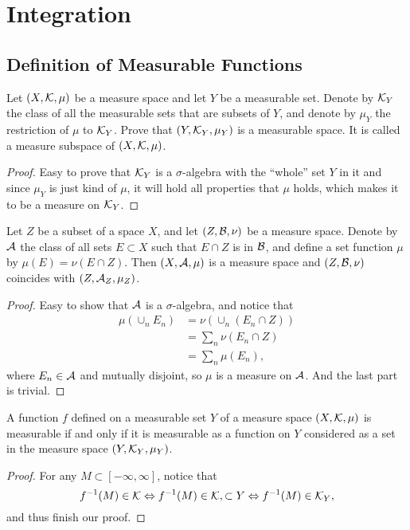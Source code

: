 \chapter{Integration}
\section{Definition of Measurable Functions}
\begin{pro}%
	Let $(X,\mathcal{K},\mu)$ be a measure space and let $Y$ be a measurable set. Denote by $\mathcal{K}_Y$ the class of all the measurable sets that are subsets of $Y$, and denote by $\mu_Y$ the restriction of $\mu$ to $\mathcal{K}_Y$. Prove that $(Y,\mathcal{K}_Y,\mu_Y)$ is a measurable space. It is called a measure subspace of $(X,\mathcal{K},\mu)$.
\end{pro}
\begin{proof}
	Easy to prove that $\mathcal{K}_Y$ is a $\sigma$-algebra with the ``whole'' set $Y$ in it and since $\mu_Y$ is just kind of $\mu$, it will hold all properties that $\mu$ holds, which makes it to be a measure on $\mathcal{K}_Y$.
\end{proof}

\begin{pro}%
	Let $Z$ be a subset of a space $X$, and let $(Z,\mathcal{B},\nu)$ be a measure space. Denote by $\mathcal{A}$ the class of all sets $E\subset X$ such that $E\cap Z$ is in $\mathcal{B}$, and define a set function $\mu$ by $\mu(E)=\nu(E\cap Z)$. Then $(X,\mathcal{A},\mu)$ is a measure space and $(Z,\mathcal{B},\nu)$ coincides with $(Z,\mathcal{A}_Z,\mu_Z)$.
\end{pro}
\begin{proof}
	Easy to show that $\mathcal{A}$ is a $\sigma$-algebra, and notice that
	\begin{align*}
		\mu(\cup_n E_n)&=\nu(\cup_n (E_n\cap Z))\\
		&=\sum_n \nu(E_n\cap Z)\\
		&=\sum_n \mu(E_n),
	\end{align*}
	where $E_n\in \mathcal{A}$ and mutually disjoint, so $\mu$ is a measure on $\mathcal{A}$. And the last part is trivial.
\end{proof}

\begin{pro}%
	A function $f$ defined on a measurable set $Y$ of a measure space $(X,\mathcal{K},\mu)$ is measurable if and only if it is measurable as a function on $Y$ considered as a set in the measure space $(Y,\mathcal{K}_Y,\mu_Y)$.
\end{pro}
\begin{proof}
	For any $M\subset[-\infty,\infty]$, notice that
	\[f^{-1}(M)\in \mathcal{K}\Leftrightarrow f^{-1}(M)\in\mathcal{K},\subset Y\Leftrightarrow f^{-1}(M)\in\mathcal{K}_Y,\]
	and thus finish our proof.
\end{proof}

